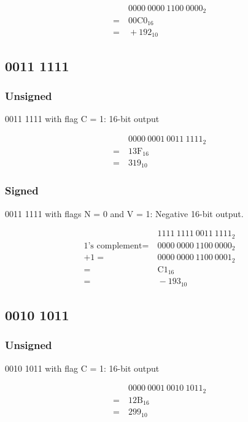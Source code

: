 \documentclass[12pt,a4paper]{article}
\begin{document}
\begin{align*}
&\ 0000\ 0000\ 1100\ 0000_{2} \\
=&\ 00\text{C}0_{16} \\
=&\ +192_{10}
\end{align*}

\subsection{0011 1111}

\subsubsection{Unsigned}

0011 1111 with flag C = 1: 16-bit output

\begin{align*}
&\ 0000\ 0001\ 0011\ 1111_{2} \\
=&\ 1\text{3F}_{16} \\
=&\ 319_{10}
\end{align*}

\subsubsection{Signed}

0011 1111 with flags N = 0 and V = 1: Negative 16-bit output.

\begin{align*}
&\ 1111\ 1111\ 0011\ 1111_{2} \\
\text{1's complement} =&\ 0000\ 0000\ 1100\ 0000_{2} \\
+ 1 =&\ 0000\ 0000\ 1100\ 0001_{2} \\
=&\ \text{C}1_{16} \\
=&\ -193_{10}
\end{align*}

\subsection{0010 1011}

\subsubsection{Unsigned}

0010 1011 with flag C = 1: 16-bit output

\begin{align*}
&\ 0000\ 0001\ 0010\ 1011_{2} \\
=&\ 12\text{B}_{16} \\
=&\ 299_{10}
\end{align*}
\end{document}
